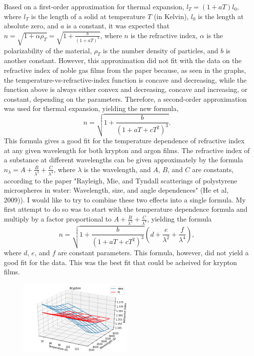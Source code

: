 \documentclass[letterpaper,12pt]{article}
\begin{document}
Based on a first-order approximation for thermal expansion, $l_T=(1+aT)l_0$, where $l_T$ is the length of a solid at temperature $T$ (in Kelvin), $l_0$ is the length at absolute zero, and $a$ is a constant, it was expected that $n=\sqrt{1+\alpha\rho_T}=\sqrt{1+\frac{b}{(1+aT)^3}}$, where $n$ is the refractive index, $\alpha$ is the polarizability of the material, $\rho_T$ is the number density of particles, and $b$ is another constant. However, this approximation did not fit with the data on the refractive index of noble gas films from the paper because, as seen in the graphs, the temperature-vs-refractive-index function is concave and decreasing, while the function above is always either convex and decreasing, concave and increasing, or constant, depending on the parameters. Therefore, a second-order approximation was used for thermal expansion, yielding the new formula, $$n=\sqrt{1+\frac{b}{(1+aT+cT^2)^3}}.$$
This formula gives a good fit for the temperature dependence of refractive index at any given wavelength for both krypton and argon films. The refractive index of a substance at different wavelengths can be given approximately by the formula $n_\lambda=A+\frac{B}{\lambda^2}+\frac{C}{\lambda^4}$, where $\lambda$ is the wavelength, and $A$, $B$, and $C$ are constants, according to the paper "Rayleigh, Mie, and Tyndall scatterings of polystyrene microspheres in water: Wavelength, size, and angle dependences" (He et al, 2009)). I would like to try to combine these two effects into a single formula. My first attempt to do so was to start with the temperature dependence formula and multiply by a factor proportional to $A+\frac{B}{\lambda^2}+\frac{C}{\lambda^4}$, yielding the formula $$n=\sqrt{1+\frac{b}{(1+aT+cT^2)^3}}(d+\frac{e}{\lambda^2}+\frac{f}{\lambda^4}),$$ where $d$, $e$, and $f$ are constant parameters. This formula, however, did not yield a good fit for the data. This was the best fit that could be acheived for krypton films. 
\begin{figure}[h!]
	\centering
	\includegraphics[width=0.5\textwidth,height=\textheight,keepaspectratio]{kryptonbad.png}
\end{figure}
\end{document}
